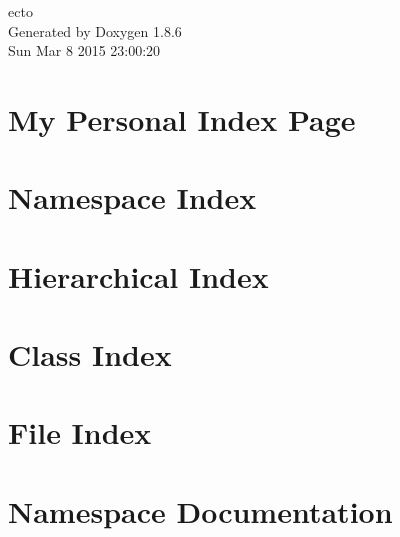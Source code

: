 \documentclass[twoside]{book}
\newcommand{\clearemptydoublepage}{%
  \newpage{\pagestyle{empty}\cleardoublepage}%
}
\begin{document}
\hypersetup{pageanchor=false}
\begin{titlepage}
\vspace*{7cm}
\begin{center}%
{\Large ecto }\\
\vspace*{1cm}
{\large Generated by Doxygen 1.8.6}\\
\vspace*{0.5cm}
{\small Sun Mar 8 2015 23:00:20}\\
\end{center}
\end{titlepage}
\clearemptydoublepage
\tableofcontents
\clearemptydoublepage
{}
\hypersetup{pageanchor=true}

\chapter{My Personal Index Page}
\label{index}\hypertarget{index}{}
\chapter{Namespace Index}

\chapter{Hierarchical Index}

\chapter{Class Index}

\chapter{File Index}

\chapter{Namespace Documentation}

















\end{document}
